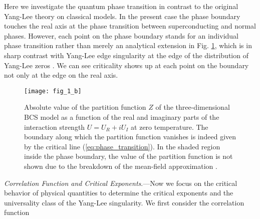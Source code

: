 \documentclass[aps,prl,twocolumn,nofootinbib,superscriptaddress,notitlepage,longbibliography]{revtex4-1}
\begin{document}
	Here we investigate the quantum phase transition in contrast to the original Yang-Lee theory \cite{PhysRev.87.404,PhysRev.87.410} on classical models. In the present case the phase boundary touches the real axis at the phase transition between superconducting and normal phases. However, each point on the phase boundary stands for an individual phase transition rather than merely an analytical extension in Fig. \ref{Phase_transition_line}, which is in sharp contrast with Yang-Lee edge singularity at the edge of the distribution of Yang-Lee zeros \cite{Fisher:1978vn}. We can see criticality shows up at each point on the boundary not only at the edge on the real axis.
	
	\begin{figure}
	\texttt{[image: fig\_1\_b]}
	
	\caption{Absolute value of the partition function $Z$ of the three-dimensional  BCS model as a function of the real and imaginary parts of the interaction strength $U=U_{R}+iU_{I}$ at zero temperature. The boundary along which the partition function vanishes is indeed given by the critical line (\ref{eq:phase_transition}). In the shaded region inside the phase boundary, the value of the partition function is not shown due to the breakdown of the mean-field approximation \cite{Yamamoto2019}.} 
	
	\label{Phase_transition_line}
	\end{figure}
	
	\emph{Correlation Function and Critical Exponents}.---Now we focus on the critical behavior of physical quantities to determine the critical exponents and the universality class of the Yang-Lee singularity. We first consider the correlation function
	
\end{document}
